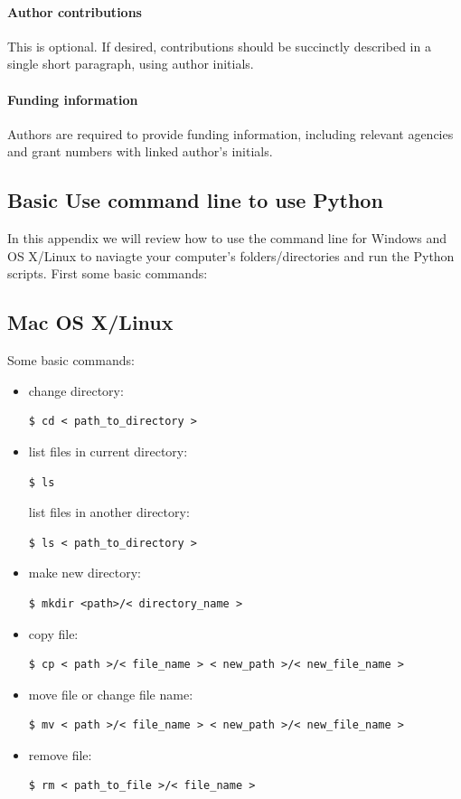 \documentclass{SciPost}
\newcommand\0{\scalebox{-1}[1]{0}}
\begin{document}
\paragraph{Author contributions}
This is optional. If desired, contributions should be succinctly described in a single short paragraph, using author initials.

\paragraph{Funding information}
Authors are required to provide funding information, including relevant agencies and grant numbers with linked author's initials.


\begin{appendix}

\section{Basic Use command line to use Python}
\label{app:cmd_line}

In this appendix we will review how to use the command line for Windows and OS X/Linux to naviagte your computer's folders/directories and run the Python scripts. First some basic commands:

\subsection{Mac OS X/Linux}
Some basic commands:

\begin{itemize}
\item change directory:
\begin{lstlisting}[numbers=none]
$ cd < path_to_directory >
\end{lstlisting}
\item list files in current directory:
\begin{lstlisting}[numbers=none]
$ ls 
\end{lstlisting}
list files in another directory:
\begin{lstlisting}[numbers=none]
$ ls < path_to_directory >
\end{lstlisting}
\item make new directory:
\begin{lstlisting}[numbers=none]
$ mkdir <path>/< directory_name >
\end{lstlisting}
\item copy file:
\begin{lstlisting}[numbers=none]
$ cp < path >/< file_name > < new_path >/< new_file_name >
\end{lstlisting}
\item move file or change file name:
\begin{lstlisting}[numbers=none]
$ mv < path >/< file_name > < new_path >/< new_file_name >
\end{lstlisting}
\item remove file:
\begin{lstlisting}[numbers=none]
$ rm < path_to_file >/< file_name >
\end{lstlisting}


\end{itemize}
\end{appendix}
\end{document}
